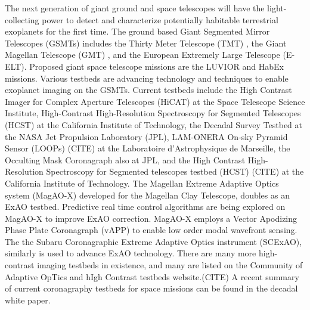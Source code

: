 \documentclass[12pt]{spieman}  %
\newcommand{\jrmrmv}[1]{\textcolor{red}{\sout{#1}}}
\newcommand{\jrmcom}[1]{\textcolor{red}{[#1]}}
\begin{document}
\begin{spacing}{2}
The next generation of giant ground and space telescopes will have the light-collecting power to detect and characterize potentially habitable terrestrial exoplanets for the first time. The ground based Giant Segmented Mirror Telescopes (GSMTs) includes the Thirty Meter Telescope (TMT) \cite{chisholm2020thirty}, the Giant Magellan Telescope (GMT) \cite{fanson2020overview}, and the European Extremely Large Telescope (E-ELT)\cite{ramsay2020eso}. Proposed giant space telescope missions are the LUVIOR\cite{2020AAS...23544704O} and HabEx\cite{gaudi2020habitable} missions. Various testbeds are advancing technology and techniques to enable exoplanet imaging on the GSMTs. Current testbeds include the High Contrast Imager for Complex Aperture Telescopes (HiCAT)\cite{2014SPIE.9143E..27N} at the Space Telescope Science Institute,  High-Contrast High-Resolution Spectroscopy for Segmented Telescopes (HCST)\cite{jovanovic2018high} at the California Institute of Technology, the Decadal Survey Testbed\cite{belikov2014ames} at the NASA Jet Propulsion Laboratory (JPL), LAM-ONERA On-sky Pyramid Sensor (LOOPs) (CITE) at the Laboratoire d'Astrophysique de Marseille, the Occulting Mask Coronagraph\cite{shi2017dynamic} also at JPL, and the High Contrast High- Resolution Spectroscopy for Segmented telescopes testbed (HCST) (CITE) at the California Institute of Technology. The Magellan Extreme Adaptive Optics system (MagAO-X)\cite{males2020magao} developed for the Magellan Clay Telescope, doubles as an ExAO testbed. Predictive real time control algorithms are being explored on MagAO-X to improve ExAO correction.\cite{haffert2021data} MagAO-X employs a Vector Apodizing Phase Plate Coronagraph (vAPP)\cite{snik2012vector} to enable low order modal wavefront sensing.\cite{2019JATIS...5d9004M} The the Subaru Coronagraphic Extreme Adaptive Optics instrument (SCExAO)\cite{jovanovic2015subaru}, similarly is used to advance ExAO technology. There are many more high-contrast imaging testbeds in existence, and many are listed on the Community of Adaptive OpTics and hIgh Contrast testbeds website.(CITE) A recent summary of current coronagraphy testbeds for space missions can be found in the decadal white paper.\cite{mazoyer2019high}


\end{spacing}
\end{document}
